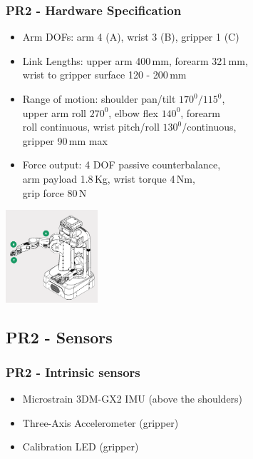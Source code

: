 \begin{frame}
  \frametitle{PR2 - Hardware Specification}
\small{
\begin{itemize}
    \item Arm DOFs: arm 4 (A), wrist 3 (B), gripper 1 (C)
    \item Link Lengths: upper arm 400\,mm, forearm 321\,mm,\\ wrist to gripper surface 120 - 200\,mm
    \item Range of motion: shoulder pan/tilt $170^0/115^0$,\\ upper arm roll $270^0$, elbow flex $140^0$, forearm \\roll continuous, wrist pitch/roll $130^0$/continuous, \\gripper 90\,mm max
    \item Force output: 4 DOF passive counterbalance, \\arm payload 1.8\,Kg, wrist torque 4\,Nm, \\grip force 80\,N
    
\end{itemize}
}
\vspace{-13ex}\hspace{47ex}\includegraphics[width=3.4cm]{../images/pr2_arm.png} 
\end{frame}

\subsection{PR2 - Sensors}
\begin{frame}
  \frametitle{PR2 - Intrinsic sensors}
\begin{itemize}
    \item Microstrain 3DM-GX2 IMU (above the shoulders)
    \item Three-Axis Accelerometer (gripper)
    \item Calibration LED (gripper) 
\end{itemize}
\end{frame}

